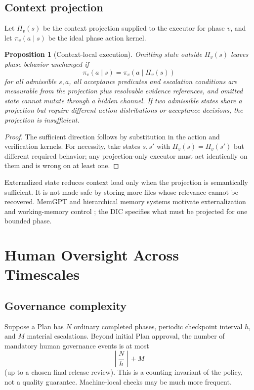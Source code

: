 \documentclass[11pt]{article}
\newtheorem{proposition}[definition]{Proposition}
\begin{document}
\subsection{Context projection}
Let $\Pi_v(s)$ be the context projection supplied to the executor for phase $v$, and let $\pi_v(a\mid s)$ be the ideal phase action kernel.
\begin{proposition}[Context-local execution]
\label{prop:context}
Omitting state outside $\Pi_v(s)$ leaves phase behavior unchanged if
\[
\pi_v(a\mid s)=\pi_v(a\mid \Pi_v(s))
\]
for all admissible $s,a$, all acceptance predicates and escalation conditions are measurable from the projection plus resolvable evidence references, and omitted state cannot mutate through a hidden channel. If two admissible states share a projection but require different action distributions or acceptance decisions, the projection is insufficient.
\end{proposition}
\begin{proof}
The sufficient direction follows by substitution in the action and verification kernels. For necessity, take states $s,s'$ with $\Pi_v(s)=\Pi_v(s')$ but different required behavior; any projection-only executor must act identically on them and is wrong on at least one.
\end{proof}
Externalized state reduces context load only when the projection is semantically sufficient. It is not made safe by storing more files whose relevance cannot be recovered. MemGPT and hierarchical memory systems motivate externalization and working-memory control \citep{packer2023memgpt,wang2024hiagent}; the DIC specifies what must be projected for one bounded phase.

\section{Human Oversight Across Timescales}
\subsection{Governance complexity}
Suppose a Plan has $N$ ordinary completed phases, periodic checkpoint interval $h$, and $M$ material escalations. Beyond initial Plan approval, the number of mandatory human governance events is at most
\[
\left\lfloor\frac{N}{h}\right\rfloor+M
\]
(up to a chosen final release review). This is a counting invariant of the policy, not a quality guarantee. Machine-local checks may be much more frequent.
\end{document}
